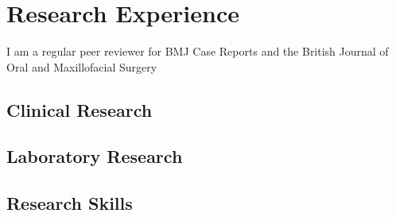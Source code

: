 \section*{Research Experience}

I am a regular peer reviewer for BMJ Case Reports and the British Journal of Oral and Maxillofacial Surgery

\subsection*{Clinical Research}

\subsection*{Laboratory Research}

\subsection*{Research Skills}

